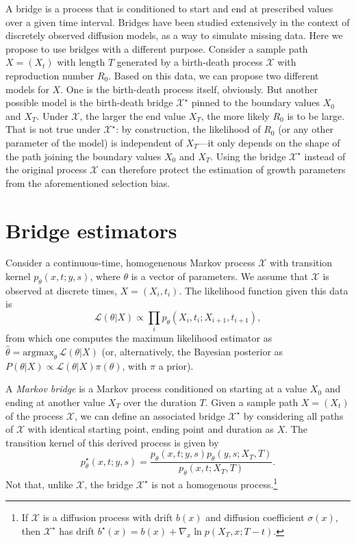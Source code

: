 \documentclass[%
 reprint,
groupedaddress,
 amsmath,amssymb,
 aps,
]{revtex4-2}
\begin{document}
A bridge is a process that is conditioned to start and end at prescribed values over a given time interval. Bridges have been studied extensively in the context of discretely observed diffusion models, as a way to simulate missing data. Here we propose to use bridges with a different purpose. Consider a sample path $X = (X_t)$ with length $T$ generated by a birth-death process $\mathcal{X}$ with reproduction number $R_0$. Based on this data, we can propose two different models for $X$. One is the birth-death process itself, obviously. But another possible model is the birth-death bridge $\mathcal{X}^\star$ pinned to the boundary values $X_0$ and $X_T$. Under $\mathcal{X}$, the larger the end value $X_T$, the more likely $R_0$ is to be large. That is not true under $\mathcal{X}^\star$: by construction, the likelihood of $R_0$ (or any other parameter of the model) is independent of $X_T$---it only depends on the shape of the path joining the boundary values $X_0$ and $X_T$. Using the bridge $\mathcal{X}^\star$ instead of the original process $\mathcal{X}$ can therefore protect the estimation of growth parameters from the aforementioned selection bias. 


\section{Bridge estimators}

Consider a continuous-time, homogenenous Markov process $\mathcal{X}$ with transition kernel $p_\theta(x, t; y, s)$, where $\theta$ is a vector of parameters. We assume that $\mathcal{X}$ is observed at discrete times, $X = (X_i, t_i)$. The likelihood function given this data is
\begin{equation}
    \mathcal{L}(\theta\vert X) \propto \prod_{i}p_{\theta}(X_i, t_i; X_{i+1}, t_{i+1}),
\end{equation}
from which one computes the maximum likelihood estimator as $\widehat{\theta} = \textrm{argmax}_\theta\, \mathcal{L}(\theta\vert X)$ (or, alternatively, the Bayesian posterior as $P(\theta\vert X)\propto \mathcal{L}(\theta\vert X) \pi(\theta)$, with $\pi$ a prior). 

A \emph{Markov bridge} is a Markov process conditioned on starting at a value $X_0$ and ending at another value $X_T$ over the duration $T$. Given a sample path $X = (X_t)$ of the process $\mathcal{X}$, we can define an associated bridge $\mathcal{X}^\star$ by considering all paths of $\mathcal{X}$ with identical starting point, ending point and duration as $X$. The transition kernel of this derived process is given by 
\begin{equation}
    p^\star_\theta(x, t; y, s)= \frac{ p_\theta(x, t; y, s)p_\theta(y, s; X_T, T) }{p_\theta(x, t; X_T, T)}.
\end{equation}
Not that, unlike $\mathcal{X}$, the bridge $\mathcal{X}^\star$ is not a homogenous process.\footnote{If $\mathcal{X}$ is a diffusion process with drift $b(x)$ and diffusion coefficient $\sigma(x)$, then $\mathcal{X}^\star$ has drift $b^\star(x) = b(x) + \nabla_x \ln p(X_T, x; T - t)$.} 
\end{document}
